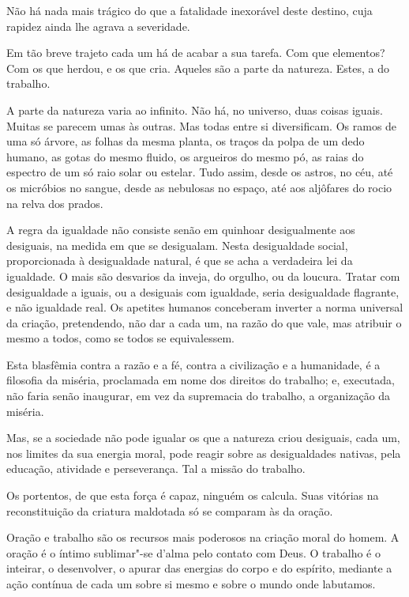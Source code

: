 Não há nada mais trágico do que a fatalidade inexorável deste
destino, cuja rapidez ainda lhe agrava a severidade.

Em tão breve trajeto cada um há de acabar a sua tarefa. Com que
elementos? Com os que herdou, e os que cria. Aqueles são a parte da
natureza. Estes, a do trabalho.

A parte da natureza varia ao infinito. Não há, no universo, duas
coisas iguais. Muitas se parecem umas às outras. Mas todas entre si
diversificam. Os ramos de uma só árvore, as folhas da mesma planta, os
traços da polpa de um dedo humano, as gotas do mesmo fluido, os
argueiros do mesmo pó, as raias do espectro de um só raio solar ou
estelar. Tudo assim, desde os astros, no céu, até os micróbios no
sangue, desde as nebulosas no espaço, até aos aljôfares do rocio na
relva dos prados.

A regra da igualdade não consiste senão em quinhoar desigualmente
aos desiguais, na medida em que se desigualam. Nesta desigualdade
social, proporcionada à desigualdade natural, é que se acha a
verdadeira lei da igualdade. O mais são desvarios da inveja, do
orgulho, ou da loucura. Tratar com desigualdade a iguais, ou a
desiguais com igualdade, seria desigualdade flagrante, e não igualdade
real. Os apetites humanos conceberam inverter a norma universal da
criação, pretendendo, não dar a cada um, na razão do que vale, mas
atribuir o mesmo a todos, como se todos se equivalessem.

Esta blasfêmia contra a razão e a fé, contra a civilização e a
humanidade, é a filosofia da miséria, proclamada em nome dos direitos
do trabalho; e, executada, não faria senão inaugurar, em vez da
supremacia do trabalho, a organização da miséria.

Mas, se a sociedade não pode igualar os que a natureza criou
desiguais, cada um, nos limites da sua energia moral, pode reagir sobre
as desigualdades nativas, pela educação, atividade e perseverança. Tal
a missão do trabalho.

Os portentos, de que esta força é capaz, ninguém os calcula. Suas
vitórias na reconstituição da criatura maldotada só se comparam às da oração.

Oração e trabalho são os recursos mais poderosos na criação moral
do homem. A oração é o íntimo sublimar"-se d'alma pelo
contato com Deus. O trabalho é o inteirar, o desenvolver, o apurar das
energias do corpo e do espírito, mediante a ação contínua de cada um
sobre si mesmo e sobre o mundo onde labutamos.


